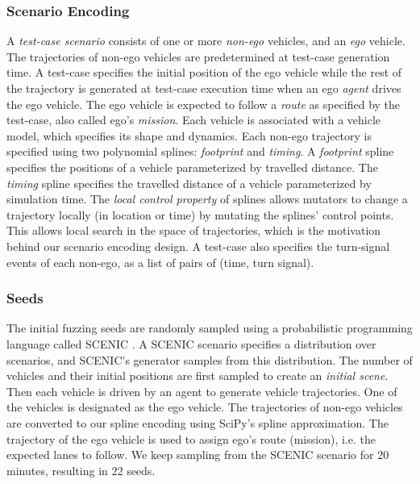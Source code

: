 \subsubsection{Scenario Encoding}
A \emph{test-case scenario} consists of one or more \emph{non-ego} vehicles, and an \emph{ego} vehicle.
%
The trajectories of non-ego vehicles are predetermined at test-case generation time.
%
A test-case specifies the initial position of the ego vehicle while the rest of the trajectory is generated at test-case execution time when an ego \emph{agent} drives the ego vehicle.
%
The ego vehicle is expected to follow a \emph{route} as specified by the test-case, also called ego's \emph{mission}.
%
Each vehicle is associated with a vehicle model, which specifies its shape and dynamics.
%
Each non-ego trajectory is specified using two polynomial splines: \emph{footprint} and \emph{timing}.
%
A \emph{footprint} spline specifies the positions of a vehicle parameterized by travelled distance.
%
The \emph{timing} spline specifies the travelled distance of a vehicle parameterized by simulation time.
%
The \emph{local control property} of splines allows mutators to change a trajectory locally (in location or time) by mutating the splines' control points.
%
This allows local search in the space of trajectories, which is the motivation behind our scenario encoding design.
%
A test-case also specifies the turn-signal events of each non-ego, as a list of pairs of (time, turn signal).


\subsubsection{Seeds}

The initial fuzzing seeds are randomly sampled using a probabilistic programming language called SCENIC \cite{Fremont.2020}.
%
A SCENIC scenario specifies a distribution over scenarios, and SCENIC's generator samples from this distribution.
%
The number of vehicles and their initial positions are first sampled to create an \emph{initial scene}.
%
Then each vehicle is driven by an agent to generate vehicle trajectories.
%
One of the vehicles is designated as the ego vehicle.
%
The trajectories of non-ego vehicles are converted to our spline encoding using SciPy's spline approximation.
%
The trajectory of the ego vehicle is used to assign ego's route (mission), i.e. the expected lanes to follow.
%
We keep sampling from the SCENIC scenario for 20 minutes, resulting in 22 seeds.

